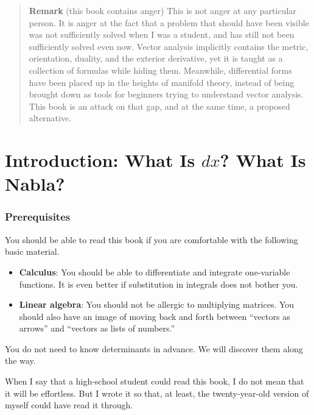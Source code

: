 \documentclass[a4paper,12pt,openany]{book}
\begin{document}
\begin{quote}
\textbf{Remark} (this book contains anger) This is not anger at any
particular person. It is anger at the fact that a problem that should
have been visible was not sufficiently solved when I was a student, and
has still not been sufficiently solved even now. Vector analysis
implicitly contains the metric, orientation, duality, and the exterior
derivative, yet it is taught as a collection of formulas while hiding
them. Meanwhile, differential forms have been placed up in the heights
of manifold theory, instead of being brought down as tools for beginners
trying to understand vector analysis. This book is an attack on that
gap, and at the same time, a proposed alternative.
\end{quote}

\newpage

\hypertarget{introduction-what-is-dx-what-is-nabla}{%
\chapter{\texorpdfstring{Introduction: What Is \(dx\)? What Is
Nabla?}{Introduction: What Is dx? What Is Nabla?}}\label{introduction-what-is-dx-what-is-nabla}}

\hypertarget{prerequisites}{%
\subsection{Prerequisites}\label{prerequisites}}

You should be able to read this book if you are comfortable with the
following basic material.

\begin{itemize}
\item
  \textbf{Calculus}: You should be able to differentiate and integrate
  one-variable functions. It is even better if substitution in integrals
  does not bother you.
\item
  \textbf{Linear algebra}: You should not be allergic to multiplying
  matrices. You should also have an image of moving back and forth
  between ``vectors as arrows'' and ``vectors as lists of numbers.''
\end{itemize}

You do not need to know determinants in advance. We will discover them
along the way.

When I say that a high-school student could read this book, I do not
mean that it will be effortless. But I wrote it so that, at least, the
twenty-year-old version of myself could have read it through.
\end{document}
